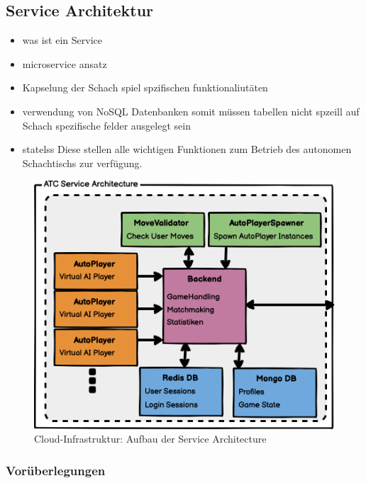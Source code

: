 \hypertarget{service-architektur}{%
\subsection{Service Architektur}\label{service-architektur}}

\begin{itemize}
\tightlist
\item
  was ist ein Service
\item
  microservice ansatz
\item
  Kapselung der Schach spiel spzifischen funktionaliutäten
\item
  verwendung von NoSQL Datenbanken somit müssen tabellen nicht spzeill
  auf Schach spezifische felder ausgelegt sein
\item
  statelss Diese stellen alle wichtigen Funktionen zum Betrieb des
  autonomen Schachtischs zur verfügung.
\end{itemize}

\begin{figure}
\centering
\includegraphics{images/ATC_Service_Architecture.png}
\caption{Cloud-Infrastruktur: Aufbau der Service Architecture}
\end{figure}

\hypertarget{voruxfcberlegungen}{%
\subsubsection{Vorüberlegungen}\label{voruxfcberlegungen}}

